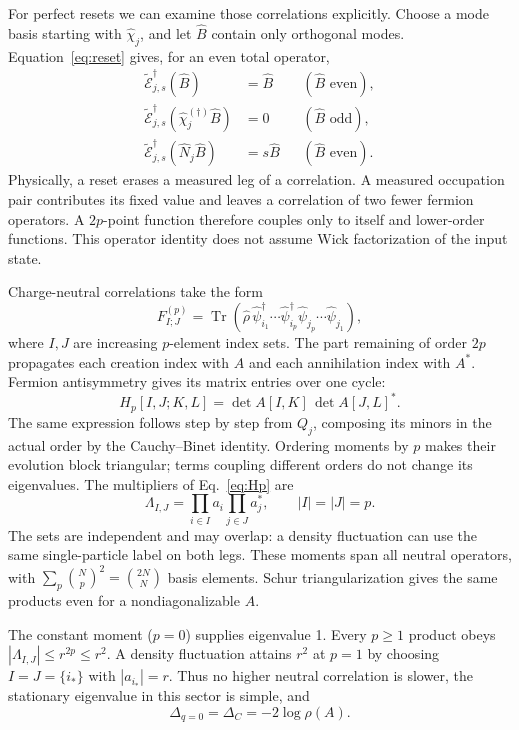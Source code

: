 \documentclass[aps,prb,twocolumn,10pt,raggedbottom,nofootinbib,superscriptaddress]{revtex4-2}
\newcommand{\Tr}{\operatorname{Tr}}
\newcommand{\E}{\widetilde{\mathcal E}}
\begin{document}
For perfect resets we can examine those correlations explicitly.
Choose a mode basis starting with $\hat\chi_j$, and let $\hat B$
contain only orthogonal modes. Equation~\eqref{eq:reset} gives,
for an even total operator,
\begin{align}
 \E_{j,s}^\dagger(\hat B)&=\hat B &&(\hat B\text{ even}),\nonumber\\
 \E_{j,s}^\dagger(\hat\chi_j^{(\dagger)}\hat B)&=0
 &&(\hat B\text{ odd}),\nonumber\\
 \E_{j,s}^\dagger(\hat N_j\hat B)&=s\hat B
 &&(\hat B\text{ even}). \label{eq:localrule}
\end{align}
Physically, a reset erases a measured leg of a correlation. A measured
occupation pair contributes its fixed value and leaves a correlation
of two fewer fermion operators. A $2p$-point function therefore couples
only to itself and lower-order functions. This operator identity does
not assume Wick factorization of the input state.

Charge-neutral correlations take the form
\begin{equation}
 F_{I;J}^{(p)}=\Tr\!\left(\hat\rho\,
 \hat\psi_{i_1}^\dagger\cdots\hat\psi_{i_p}^\dagger
 \hat\psi_{j_p}\cdots\hat\psi_{j_1}\right), \label{eq:moments}
\end{equation}
where $I,J$ are increasing $p$-element index sets. The part remaining
of order $2p$ propagates each creation index with $A$ and each
annihilation index with $A^*$. Fermion antisymmetry gives its matrix
entries over one cycle:
\begin{equation}
 H_p[I,J;K,L]=\det A[I,K]\,\det A[J,L]^*. \label{eq:Hp}
\end{equation}
The same expression follows step by step from $Q_j$, composing its
minors in the actual order by the Cauchy--Binet identity. Ordering
moments by $p$ makes their evolution block triangular; terms coupling
different orders do not change its eigenvalues. The multipliers
of Eq.~\eqref{eq:Hp} are
\begin{equation}
 \Lambda_{I,J}=\prod_{i\in I}a_i\prod_{j\in J}a_j^*,\qquad
 |I|=|J|=p. \label{eq:products}
\end{equation}
The sets are independent and may overlap: a density fluctuation can
use the same single-particle label on both legs. These moments span
all neutral operators, with
$\sum_p\binom Np^2=\binom{2N}{N}$ basis elements. Schur triangularization
gives the same products even for a nondiagonalizable $A$.

The constant moment ($p=0$) supplies eigenvalue 1. Every $p\ge1$
product obeys $|\Lambda_{I,J}|\le r^{2p}\le r^2$. A density fluctuation
attains $r^2$ at $p=1$ by choosing $I=J=\{i_*\}$ with
$|a_{i_*}|=r$. Thus no higher neutral correlation is slower, the
stationary eigenvalue in this sector is simple, and
\begin{equation}
 \boxed{\Delta_{q=0}=\Delta_C=-2\log\rho(A).} \label{eq:neutralgap}
\end{equation}
\end{document}
